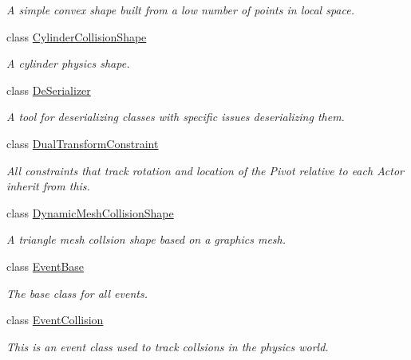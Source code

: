 \begin{DoxyCompactItemize}
\begin{DoxyCompactList}\small\item\em A simple convex shape built from a low number of points in local space. \item\end{DoxyCompactList}\item 
class \hyperlink{classphys_1_1CylinderCollisionShape}{CylinderCollisionShape}
\begin{DoxyCompactList}\small\item\em A cylinder physics shape. \item\end{DoxyCompactList}\item 
class \hyperlink{classphys_1_1DeSerializer}{DeSerializer}
\begin{DoxyCompactList}\small\item\em A tool for deserializing classes with specific issues deserializing them. \item\end{DoxyCompactList}\item 
class \hyperlink{classphys_1_1DualTransformConstraint}{DualTransformConstraint}
\begin{DoxyCompactList}\small\item\em All constraints that track rotation and location of the Pivot relative to each Actor inherit from this. \item\end{DoxyCompactList}\item 
class \hyperlink{classphys_1_1DynamicMeshCollisionShape}{DynamicMeshCollisionShape}
\begin{DoxyCompactList}\small\item\em A triangle mesh collsion shape based on a graphics mesh. \item\end{DoxyCompactList}\item 
class \hyperlink{classphys_1_1EventBase}{EventBase}
\begin{DoxyCompactList}\small\item\em The base class for all events. \item\end{DoxyCompactList}\item 
class \hyperlink{classphys_1_1EventCollision}{EventCollision}
\begin{DoxyCompactList}\small\item\em This is an event class used to track collsions in the physics world. \item\end{DoxyCompactList}\item 

\end{DoxyCompactItemize}
